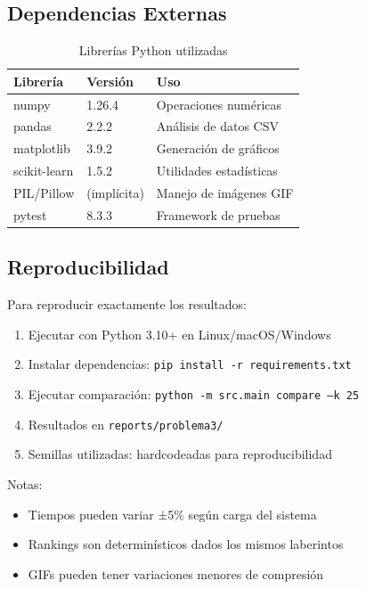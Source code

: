 \documentclass[12pt,a4paper]{article}
\begin{document}
\subsection{Dependencias Externas}

\begin{table}[H]
\centering
\caption{Librerías Python utilizadas}
\begin{tabular}{|l|l|l|}
\hline
\textbf{Librería} & \textbf{Versión} & \textbf{Uso} \\
\hline
numpy & 1.26.4 & Operaciones numéricas \\
pandas & 2.2.2 & Análisis de datos CSV \\
matplotlib & 3.9.2 & Generación de gráficos \\
scikit-learn & 1.5.2 & Utilidades estadísticas \\
PIL/Pillow & (implícita) & Manejo de imágenes GIF \\
pytest & 8.3.3 & Framework de pruebas \\
\hline
\end{tabular}
\end{table}

\subsection{Reproducibilidad}

Para reproducir exactamente los resultados:

\begin{enumerate}
    \item Ejecutar con Python 3.10+ en Linux/macOS/Windows
    \item Instalar dependencias: \texttt{pip install -r requirements.txt}
    \item Ejecutar comparación: \texttt{python -m src.main compare --k 25}
    \item Resultados en \texttt{reports/problema3/}
    \item Semillas utilizadas: hardcodeadas para reproducibilidad
\end{enumerate}

Notas:
\begin{itemize}
    \item Tiempos pueden variar ±5\% según carga del sistema
    \item Rankings son determinísticos dados los mismos laberintos
    \item GIFs pueden tener variaciones menores de compresión
\end{itemize}
\end{document}
